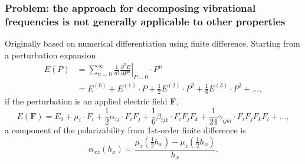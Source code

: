\documentclass[%
    xcolor=usenames,dvipsnames,svgnames%
]{beamer}
\begin{document}
\begin{frame}
  \frametitle{Problem: the approach for decomposing vibrational frequencies is not generally applicable to other properties}
  Originally based on numerical differentiation using finite difference. Starting from a perturbation expansion
  \begin{equation*}
    \label{eq:maclaurin-expansion}
    \begin{aligned}
      E(P) &= \sum_{n = 0}^{\infty} \frac{1}{n!} \left. \frac{\partial^{n} E}{\partial P^{n}} \right|_{P = 0} \cdot P^{n} \\
      &= E^{(0)} + E^{(1)} \cdot P + \frac{1}{2} E^{(2)} \cdot P^{2} + \frac{1}{6} E^{(3)} \cdot P^{3} + \dots,
    \end{aligned}
  \end{equation*}
  if the perturbation is an applied electric field \(\mathbf{F}\),
  \begin{equation*}
    \label{eq:electric-field-expansion}
    E(\mathbf{F}) = E_{0} + \mu_{i} \cdot F_{i} + \frac{1}{2} \alpha_{ij} \cdot F_{i}F_{j} + \frac{1}{6} \beta_{ijk} \cdot F_{i}F_{j}F_{k} + \frac{1}{24} \gamma_{ijkl} \cdot F_{i}F_{j}F_{k}F_{l} + \dots,
  \end{equation*}
  a component of the polarizability from 1st-order finite difference is
  \begin{equation*}
    \label{eq:finite-difference-polarizability}
    \alpha_{xz}(h_{x}) = \frac{\mu_{z}(\frac{1}{2}h_{x}) - \mu_{z}(\frac{1}{2}h_{x})}{h_{x}}.
  \end{equation*}
\end{frame}
\end{document}
